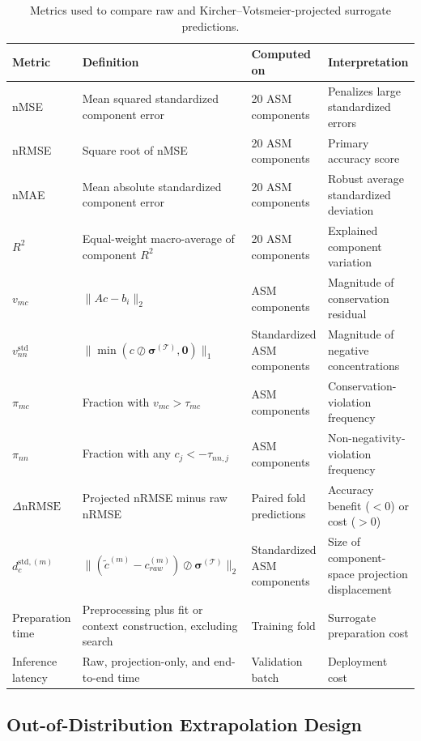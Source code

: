 \documentclass[a4paper,fleqn]{cas-sc}
\newcommand{\csvcomma}{,}
\begin{document}
\begin{table}[htbp]
\centering
\caption{Metrics used to compare raw and Kircher--Votsmeier-projected surrogate predictions.}
\label{tab:evaluation_metrics}
\scriptsize
\setlength{\tabcolsep}{3pt}
\begin{tabular}{p{2.3cm}p{3.5cm}p{2.4cm}p{2.4cm}}
\hline
Metric & Definition & Computed on & Interpretation \\
\hline
nMSE & Mean squared standardized component error & 20 ASM components & Penalizes large standardized errors \\
nRMSE & Square root of nMSE & 20 ASM components & Primary accuracy score \\
nMAE & Mean absolute standardized component error & 20 ASM components & Robust average standardized deviation \\
$R^2$ & Equal-weight macro-average of component $R^2$ & 20 ASM components & Explained component variation \\
$v_{mc}$ & $\|Ac-b_i\|_2$ & ASM components & Magnitude of conservation residual \\
$v_{nn}^{\mathrm{std}}$ & $\|\min(c\oslash\boldsymbol{\sigma}^{(\mathcal{T})}\csvcomma{}\mathbf{0})\|_1$ & Standardized ASM components & Magnitude of negative concentrations \\
$\pi_{mc}$ & Fraction with $v_{mc}>\tau_{mc}$ & ASM components & Conservation-violation frequency \\
$\pi_{nn}$ & Fraction with any $c_j<-\tau_{nn\csvcomma{}j}$ & ASM components & Non-negativity-violation frequency \\
$\Delta\mathrm{nRMSE}$ & Projected nRMSE minus raw nRMSE & Paired fold predictions & Accuracy benefit ($<0$) or cost ($>0$) \\
$d_c^{\mathrm{std}\csvcomma{}(m)}$ & $\|(\tilde c^{(m)}-c_{raw}^{(m)})\oslash\boldsymbol{\sigma}^{(\mathcal{T})}\|_2$ & Standardized ASM components & Size of component-space projection displacement \\
Preparation time & Preprocessing plus fit or context construction\csvcomma{} excluding search & Training fold & Surrogate preparation cost \\
Inference latency & Raw\csvcomma{} projection-only\csvcomma{} and end-to-end time & Validation batch & Deployment cost \\
\hline
\end{tabular}
\end{table}

\subsection{Out-of-Distribution Extrapolation Design}
\end{document}
